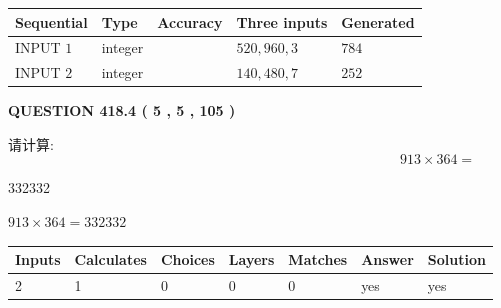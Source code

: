 \documentclass{ctexart}
\begin{document}
   
  
  
\noindent\begin{tabular}{|l|l|l|l|l|}
\hline
 Sequential & Type & Accuracy & Three inputs & Generated \\ 
\hline
 
 
  INPUT $  1 $ & integer &  & $
 520
 , 
 960
 , 
 3
 $ & $ 784 $ 
 \\  \hline  
 
 
  INPUT $  2 $ & integer &  & $
 140
 , 
 480
 , 
 7
 $ & $ 252 $ 
 \\  \hline  
 \end{tabular}
   
   
  
\vspace{0.2in}
  
{\textbf{\Large{QUESTION
418.4 
 ( 5 , 5 , 105 )
}}}
  
  
 
请计算:
\begin{equation}
913  \times    %
364 = \nonumber
\end{equation}
 
 
 
\noindent{}
 
 

332332
 
 
\noindent{}
 
 

 
 
 
\noindent{}
 
 

$ %
913 \times  %
364=   %
332332$
 
 
\noindent{}
 
 

 
   
   
   
   
\noindent\begin{tabular}{|l|l|l|l|l|l|l|}
 \hline
Inputs & Calculates & Choices & Layers & Matches & Answer & Solution \\ \hline
 2  & 
 1  & 
 0
  & 
 0  & 
 0  & 
  yes & 
  yes 
  \\ \hline
 \end{tabular}
   
\end{document}

